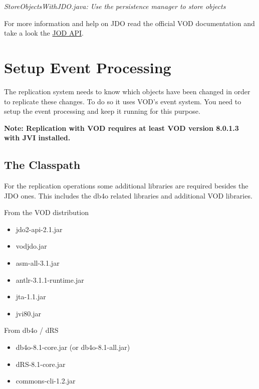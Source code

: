 {\small\itshape StoreObjectsWithJDO.java: Use the persistence manager to store objects\par}
\medskip

For more information and help on JDO read the official VOD documentation and take a look the \href{https://www.datanucleus.org/products/accessplatform/jdo/}{JOD API}.

\section{Setup Event Processing}
\label{drs:db4o-replication-system-drs-vod-setup-event-processing}

The replication system needs to know which objects have been changed in order to replicate these changes. To do so it uses VOD's event system. You need to setup the event processing and keep it running for this purpose.

\textbf{Note: Replication with VOD requires at least VOD version 8.0.1.3 with JVI installed.}

\subsection*{The Classpath}

For the replication operations some additional libraries are required besides the JDO ones. This includes the db4o related libraries and additional VOD libraries.

From the VOD distribution

\begin{itemize}
\item jdo2-api-2.1.jar
\item vodjdo.jar
\item asm-all-3.1.jar
\item antlr-3.1.1-runtime.jar
\item jta-1.1.jar
\item jvi80.jar
\end{itemize}

From db4o / dRS

\begin{itemize}
\item db4o-8.1-core.jar (or db4o-8.1-all.jar)
\item dRS-8.1-core.jar
\end{itemize}

\begin{itemize}
\item commons-cli-1.2.jar
\end{itemize}

